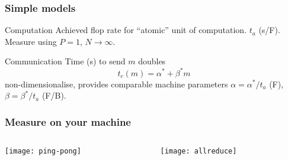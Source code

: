 \documentclass[presentation]{beamer}
\begin{document}
\begin{frame}
  \frametitle{Simple models}
  \begin{block}{Computation}
    Achieved flop rate for ``atomic'' unit of computation.
    $t_a$ (s/F).  Measure using $P=1$, $N\rightarrow\infty$.
  \end{block}
  \begin{block}{Communication}
    Time (s) to send $m$ doubles
    \begin{equation*}
      t_c(m) = \alpha^* + \beta^* m
    \end{equation*}
    non-dimensionalise, provides comparable machine parameters
    $\alpha = \alpha^*/t_a$ (F), $\beta = \beta^*/t_a$ (F/B).
  \end{block}
\end{frame}

\begin{frame}
  \frametitle{Measure on your machine}
  \begin{columns}
    \begin{column}{0.5\textwidth}
      \texttt{[image: ping-pong]}
    \end{column}
    \begin{column}{0.5\textwidth}
      \texttt{[image: allreduce]}
    \end{column}
  \end{columns}
\end{frame}
\end{document}

